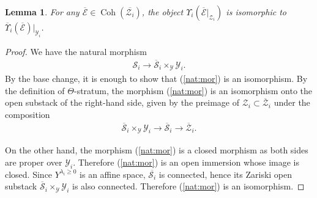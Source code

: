 \documentclass [11pt,oneside,a4paper,mathscr]{amsart}
\newtheorem{lemma}[thm]{Lemma}
\theoremstyle{definition}
\renewcommand{\geq}{\geqslant}
\newcommand{\Coh}{\operatorname{Coh}}
\begin{document}
\begin{lemma}\label{lem:extend}
    For any $\overline{\mathcal{E}} \in \Coh(\overline{\mathcal{Z}_i})$,
    the object $\Upsilon_i(\overline{\mathcal{E}}|_{\mathcal{Z}_i})$ is isomorphic 
    to $\overline{\Upsilon}_i(\overline{\mathcal{E}})|_{\mathcal{Y}_i}$. 
\end{lemma}
\begin{proof}
    We have the natural morphism 
    \begin{align}\label{nat:mor}
    \mathcal{S}_i \to \overline{\mathcal{S}}_i\times_{\mathcal{Y}}\mathcal{Y}_i.
    \end{align}
By the base change, it is enough to show that (\ref{nat:mor}) is an isomorphism.  
By the definition of $\Theta$-stratum, the morphism (\ref{nat:mor})    
is an isomorphism onto the open substack of the right-hand side, given by the preimage of 
$\mathcal{Z}_i \subset \overline{\mathcal{Z}}_i$ 
under the composition \begin{align*}\overline{\mathcal{S}}_i \times_{\mathcal{Y}} \mathcal{Y}_i \to 
\overline{\mathcal{S}}_i \to \overline{\mathcal{Z}}_i.\end{align*}

On the other hand, the morphism (\ref{nat:mor}) is
a closed morphism as both sides are proper over $\mathcal{Y}_i$. 
Therefore (\ref{nat:mor}) is an open immersion whose image is closed. 
Since $Y^{\lambda_i \geq 0}$ is an affine space, $\overline{\mathcal{S}_i}$ is connected, 
hence its Zariski open substack $\overline{\mathcal{S}}_i \times_{\mathcal{Y}}\mathcal{Y}_i$ is also connected. Therefore (\ref{nat:mor}) is 
an isomorphism. 
\end{proof}
\end{document}

